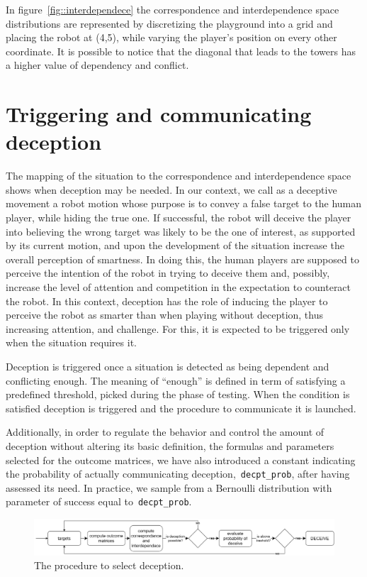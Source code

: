 In figure~\ref{fig::interdependece} the correspondence and interdependence space distributions are represented by discretizing the playground into a grid and placing the robot at (4,5), while varying the  player's position on every other coordinate. It is possible to notice that the diagonal that leads to the towers has a higher value of dependency and conflict.

\section{Triggering and communicating deception}\label{sec:deception_communicating}
The mapping of the situation to the correspondence and interdependence space shows when deception may be needed. In our context, we call as a deceptive movement a robot motion whose purpose is to convey a false target to the human player, while hiding the true one. If successful, the robot will deceive the player into believing the wrong target was likely to be the one of interest, as supported by its current motion, and upon the development of the situation increase the overall perception of smartness. In doing this, the human players are supposed to perceive the intention of the robot in trying to deceive them and, possibly, increase the level of attention and competition in the expectation to counteract the robot. In this context, deception has the role of inducing the player to perceive the robot as smarter than when playing without deception, thus increasing attention, and challenge. For this, it is expected to be triggered only when the situation requires it. 

Deception is triggered once a situation is detected as being dependent and conflicting enough. The meaning of ``enough'' is defined in term of satisfying a predefined threshold, picked during the phase of testing. When the condition is satisfied deception is triggered and the procedure to communicate it is launched.

Additionally, in order to regulate the behavior and control the amount of deception without altering its basic definition, \ie the formulas and parameters selected for the outcome matrices, we have also introduced a constant indicating the probability of actually communicating deception,~\verb|decpt_prob|,  after having assessed its need. In practice, we sample from a Bernoulli distribution with parameter of success equal to~\verb|decpt_prob|. 

\begin{figure}[h]
    \centering
    \includegraphics[draft=false, width=\textwidth]{images/06-deception/flowchart}
    \caption{The procedure to select deception.}
    \label{fig:flowchart}
\end{figure}

